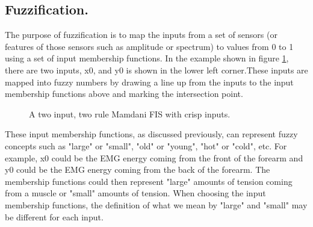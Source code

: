 \subsection{Fuzzification.}

The purpose of fuzzification is to map the inputs from a set of sensors (or
features of those sensors such as amplitude or spectrum) to values from 0 to 1
using a set of input membership functions. In the example shown in figure \ref{fig:mamdaniFis},
there are two inputs, x0, and y0 is shown in the lower left corner.These inputs
are mapped into fuzzy numbers by drawing a line up from the inputs to the input
membership functions above and marking the intersection point.

\begin{figure}
\captionsetup{justification=centering,margin=2cm}
\centering
\setlength\fboxsep{0pt}
\setlength\fboxrule{0.7pt}
\caption{A two input, two rule Mamdani FIS with crisp inputs.}
\label{fig:mamdaniFis}
\end{figure}

These input membership functions, as discussed previously, can represent fuzzy concepts
such as "large" or "small", "old" or "young", "hot" or "cold", etc. For example, x0
could be the EMG energy coming from the front of the forearm and y0 could be the
EMG energy coming from the back of the forearm. The membership functions could
then represent "large" amounts of tension coming from a muscle or "small"
amounts of tension. When choosing the input membership functions, the definition
of what we mean by "large" and "small" may be different for each input.


